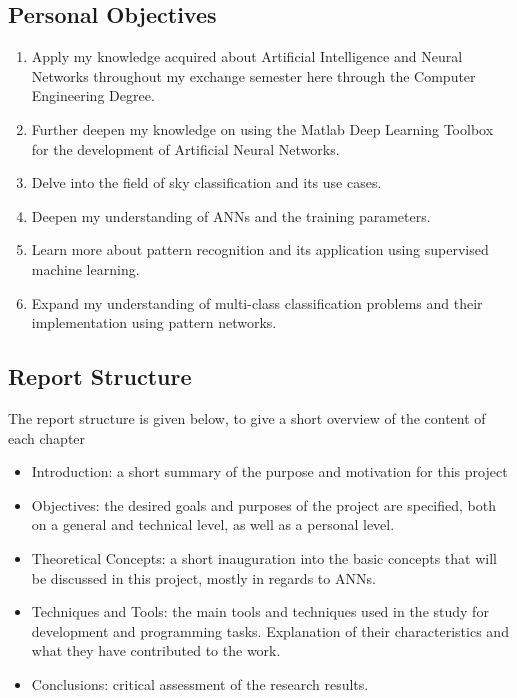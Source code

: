 \subsection{Personal Objectives}
\begin{enumerate}
    \item Apply my knowledge acquired about Artificial Intelligence and Neural Networks throughout my exchange semester here through the Computer Engineering Degree.
    \item Further deepen my knowledge on using the Matlab Deep Learning Toolbox for the development of Artificial Neural Networks.
    \item Delve into the field of sky classification and its use cases.
    \item Deepen my understanding of ANNs and the training parameters.
    \item Learn more about pattern recognition and its application using supervised machine learning.
    \item Expand my understanding of multi-class classification problems and their implementation using pattern networks.
\end{enumerate}
\subsection{Report Structure}
The report structure is given below, to give a short overview of the content of each chapter
\begin{itemize}
    \item Introduction: a short summary of the purpose and motivation for this project
	\item Objectives: the desired goals and purposes of the project are specified, both on a general and technical level, as well as a personal level.
	\item Theoretical Concepts: a short inauguration into the basic concepts that will be discussed in this project, mostly in regards to ANNs.
    \item Techniques and Tools: the main tools and techniques used in the study for development and programming tasks. Explanation of their characteristics and what they have contributed to the work.
    \item Conclusions: critical assessment of the research results.
\end{itemize}